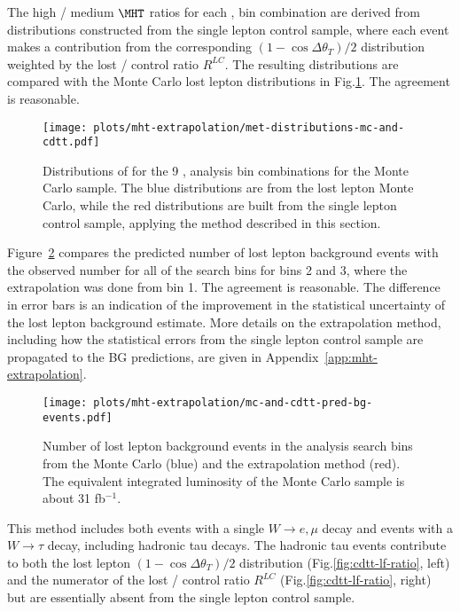 The high / medium $\MHT$ ratios for each \njets, \HT bin combination are derived from \MHT distributions
constructed from the single lepton control sample, where each event makes a contribution from the corresponding
$\left( 1 - \cos \Delta \theta_T \right) / 2$ distribution weighted by the lost / control ratio $R^{LC}$.
The resulting \MHT distributions are compared with the Monte Carlo lost lepton \MHT distributions in
Fig.\ref{fig:mc-and-cdtt-mht-distributions}.
The agreement is reasonable.



\begin{figure}[!h]
  \centering
  \texttt{[image: plots/mht-extrapolation/met-distributions-mc-and-cdtt.pdf]}
  \caption{
    Distributions of \MHT for the 9 \njets, \HT analysis bin combinations for the \ttbar Monte Carlo sample.
    The blue distributions are from the lost lepton Monte Carlo, while the red distributions are
    built from the single lepton control sample, applying the method described in this section.
  }
  \label{fig:mc-and-cdtt-mht-distributions}
\end{figure}


Figure~\ref{fig:mc-and-cdtt-pred-bg-events} compares the predicted number of \ttbar lost lepton background
events with the observed number for all of the search bins for \MHT bins 2 and 3, where the extrapolation was
done from \MHT bin 1.
The agreement is reasonable.  The difference in error bars is an indication of the improvement in the
statistical uncertainty of the lost lepton background estimate.
More details on the \MHT extrapolation method, including how the statistical errors from the
single lepton control sample are propagated to the BG predictions, are given in Appendix~\ref{app:mht-extrapolation}.

\begin{figure}[!h]
  \centering
  \texttt{[image: plots/mht-extrapolation/mc-and-cdtt-pred-bg-events.pdf]}
  \caption{
    Number of \ttbar lost lepton background events in the analysis search bins from
    the Monte Carlo (blue) and the \MHT extrapolation method (red).
    The equivalent integrated luminosity of the \ttbar Monte Carlo sample is about 31 fb$^{-1}$.
  }
  \label{fig:mc-and-cdtt-pred-bg-events}
\end{figure}


This method includes both events with a single $W \to e,\mu$ decay and events with a
$W \to \tau$ decay, including hadronic tau decays.
The hadronic tau events contribute to both the lost lepton
$\left( 1 - \cos \Delta \theta_T \right) / 2$ distribution (Fig.\ref{fig:cdtt-lf-ratio}, left)
and the numerator of the lost / control ratio $R^{LC}$ (Fig.\ref{fig:cdtt-lf-ratio}, right)
but are essentially absent from the single lepton control sample. 

